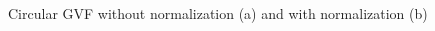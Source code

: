 \documentclass[numbered,pdftex]{ohio-etd}
\begin{document}
\begin{figure}[H]
	\begin{subfigmatrix}{2}%
		\centering	
		\hspace*{0mm}
	\end{subfigmatrix}
	\caption{Circular GVF without normalization (a) and with normalization (b)}
	\label{fig:gvfCircCirculation}
\end{figure}
\end{document}
